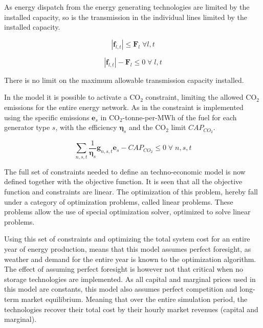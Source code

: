 As energy dispatch from the energy generating technologies are limited by the installed capacity, so is the transmission in the individual lines limited by the installed capacity. 

\begin{equation}
	|\mathbf{f}_{l,t}| \leq \mathbf{F}_l \; \forall l,t
\end{equation}

\begin{equation}
	|\mathbf{f}_{l,t}| - \mathbf{F}_l  \leq 0 \; \forall \; l,t
\end{equation}

There is no limit on the maximum allowable transmission capacity installed. 

In the model it is possible to activate a $\text{CO}_2$ constraint, limiting the allowed $\text{CO}_2$ emissions for the entire energy network. As in \cite{PyPSA_euro_30_model} the constraint is implemented using the specific emissions $\mathbf{e}_s$ in $\text{CO}_2$-tonne-per-MWh of the fuel for each generator type $s$, with the efficiency $\mathbf{\eta}_s$ and the $\text{CO}_2$ limit $CAP_{CO_2}$. 

\begin{equation}
\sum_{n,s,t} \frac{1}{\mathbf{\eta}_s}\mathbf{g}_{n,s,t} \mathbf{e}_s -CAP_{CO_2} \leq 0 \; \forall \; n,s,t
\end{equation}


The full set of constraints needed to define an techno-economic model is now defined together with the objective function. It is seen that all the objective function and constraints are linear. The optimization of this problem, hereby fall under a category of optimization problems, called linear problems. These problems allow the use of special optimization solver, optimized to solve linear problems. 

Using this set of constraints and optimizing the total system cost for an entire year of energy production, means that this model assumes perfect foresight, as weather and demand for the entire year is known to the optimization algorithm. The effect of assuming perfect foresight is however not that critical when no storage technologies are implemented. 
As all capital and marginal prices used in this model are constants, this model also assumes perfect competition and long-term market equilibrium. Meaning that over the entire simulation period, the technologies recover their total cost by their hourly market revenues (capital and marginal).

